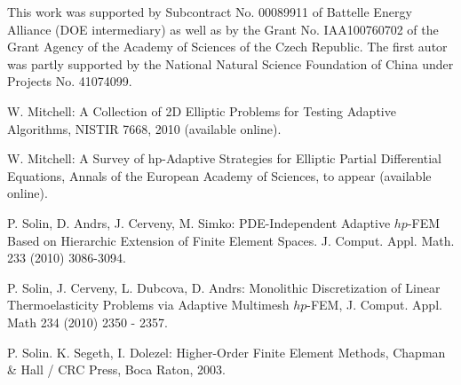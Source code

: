 \documentclass[12pt]{elsarticle}
\begin{document}
This work was supported by Subcontract No. 00089911 of Battelle
Energy Alliance (DOE intermediary) as well as by the
Grant No. IAA100760702 of the Grant Agency of the Academy
of Sciences of the Czech Republic. The first autor was partly
supported by the National Natural Science Foundation
of China under Projects No. 41074099.








\begin{thebibliography}{[KLR73]}

W. Mitchell: A Collection of 2D Elliptic Problems for
Testing Adaptive Algorithms, NISTIR 7668, 2010 (available online).

\vspace{-2mm}

W. Mitchell: A Survey of hp-Adaptive Strategies for Elliptic Partial Differential Equations,
Annals of the European Academy of Sciences, to appear (available online).

\vspace{-2mm}

P. Solin, D. Andrs, J. Cerveny, M. Simko:
PDE-Independent Adaptive $hp$-FEM Based on Hierarchic Extension of Finite Element Spaces.
J. Comput. Appl. Math. 233 (2010) 3086-3094.

\vspace{-2mm}

P. Solin, J. Cerveny, L. Dubcova, D. Andrs:
Monolithic Discretization of Linear Thermoelasticity Problems
via Adaptive Multimesh $hp$-FEM, J. Comput. Appl. Math 234 (2010) 2350 - 2357.

\vspace{-2mm}

P. Solin. K. Segeth, I. Dolezel: Higher-Order Finite Element Methods, Chapman \& Hall
/ CRC Press, Boca Raton, 2003.
\end{thebibliography}

\end{document}
